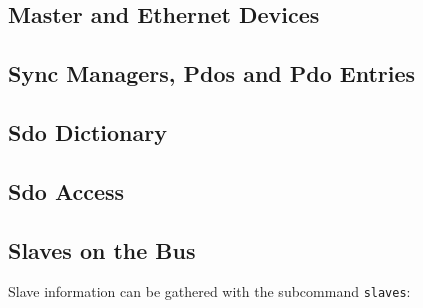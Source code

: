 \documentclass[a4paper,12pt,BCOR6mm,bibtotoc,idxtotoc]{scrbook}
\begin{document}



\subsection{Master and Ethernet Devices}




\subsection{Sync Managers, Pdos and Pdo Entries}




\subsection{Sdo Dictionary}




\subsection{Sdo Access}






\subsection{Slaves on the Bus}

Slave information can be gathered with the subcommand \lstinline+slaves+:
\end{document}

